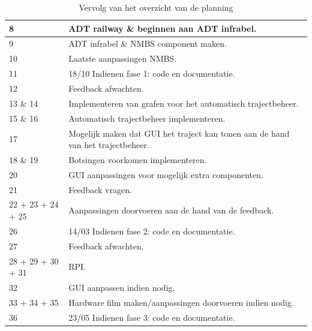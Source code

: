 \documentclass{article}
\begin{document}
\begin{table}[h!]
        \centering
        \begin{tabular}{|p{2cm}|p{11cm}|}
                \hline
                8 & ADT railway \& beginnen aan ADT infrabel.\\
                \hline
                9 & ADT infrabel \& NMBS component maken.\\
                \hline
                10 & Laatste aanpassingen NMBS.\\
                \hline
                11 & 18/10 Indienen fase 1: code en documentatie.\\
                \hline
                12 & Feedback afwachten.\\
                \hline
                13 \& 14 & Implementeren van grafen voor het automatisch trajectbeheer.\\
                \hline
                15 \& 16 & Automatisch trajectbeheer implementeren.\\
                \hline
                17 & Mogelijk maken dat GUI het traject kan tonen aan de hand van het trajectbeheer.\\
                \hline
                18 \& 19 & Botsingen voorkomen implementeren.\\
                \hline
                20 & GUI aanpassingen voor mogelijk extra componenten.\\
                \hline
                21 & Feedback vragen.\\
                \hline
                22 + 23 + 24 + 25 & Aanpassingen doorvoeren aan de hand van de feedback.\\
                \hline
                26 & 14/03 Indienen fase 2: code en documentatie.\\
                \hline
                27 & Feedback afwachten.\\
                \hline
                28 + 29 + 30 + 31 & RPI.\\
                \hline
                32 & GUI aanpassen indien nodig.\\
                \hline
                33 + 34 + 35 & Hardware film maken/aanpassingen doorvoeren indien nodig.\\
                \hline
                36 & 23/05 Indienen fase 3: code en documentatie.\\
                \hline
        \end{tabular}
        \caption{Vervolg van het overzicht van de planning}
\end{table}
\end{document}
